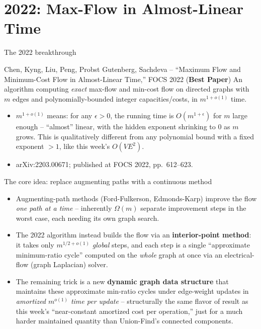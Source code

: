 \documentclass[11pt,aspectratio=169]{beamer}
\begin{document}
\section{2022: Max-Flow in Almost-Linear Time}

\begin{frame}{The 2022 breakthrough}
  \begin{block}{Chen, Kyng, Liu, Peng, Probst Gutenberg, Sachdeva -- ``Maximum Flow and
  Minimum-Cost Flow in Almost-Linear Time,'' FOCS 2022 (\textbf{Best Paper})}
    An algorithm computing \emph{exact} max-flow and min-cost flow on directed graphs
    with $m$ edges and polynomially-bounded integer capacities/costs, in
    $m^{1+o(1)}$ time.
  \end{block}
  \begin{itemize}
    \item $m^{1+o(1)}$ means: for any $\epsilon>0$, the running time is
    $O(m^{1+\epsilon})$ for $m$ large enough -- ``almost'' linear, with the hidden
    exponent shrinking to $0$ as $m$ grows. This is qualitatively different from any
    polynomial bound with a fixed exponent $>1$, like this week's $O(VE^2)$.
    \item arXiv:2203.00671; published at FOCS 2022, pp.\ 612--623.
  \end{itemize}
\end{frame}

\begin{frame}{The core idea: replace augmenting paths with a continuous method}
  \begin{itemize}
    \item Augmenting-path methods (Ford-Fulkerson, Edmonds-Karp) improve the flow
    \emph{one path at a time} -- inherently $\Omega(m)$ separate improvement steps in
    the worst case, each needing its own graph search.
    \item The 2022 algorithm instead builds the flow via an \textbf{interior-point
    method}: it takes only $m^{1/2+o(1)}$ \emph{global} steps, and each step is a
    single ``approximate minimum-ratio cycle'' computed on the \emph{whole} graph at
    once via an electrical-flow (graph Laplacian) solver.
    \item The remaining trick is a new \textbf{dynamic graph data structure} that
    maintains these approximate min-ratio cycles under edge-weight updates in
    \emph{amortized $m^{o(1)}$ time per update} -- structurally the same flavor of
    result as this week's ``near-constant amortized cost per operation,'' just for a
    much harder maintained quantity than Union-Find's connected components.
  \end{itemize}
\end{frame}
\end{document}
